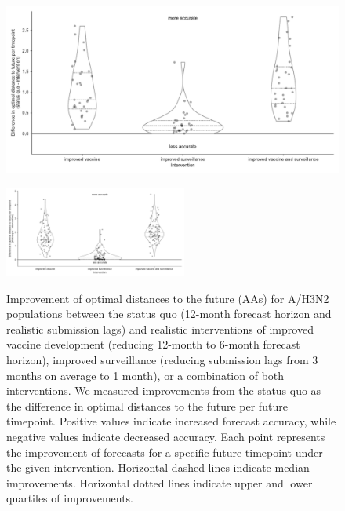 \documentclass[9pt,lineno]{elife}
\begin{document}
\begin{figure}[htb!]
\includegraphics[width=\linewidth]{figures/h3n2_optimal_effects_of_realistic_interventions_on_distances_to_the_future}
\caption{Improvement of optimal distances to the future (AAs) for A/H3N2 populations between the status quo (12-month forecast horizon and realistic submission lags) and realistic interventions of improved vaccine development (reducing 12-month to 6-month forecast horizon), improved surveillance (reducing submission lags from 3 months on average to 1 month), or a combination of both interventions.
  We measured improvements from the status quo as the difference in optimal distances to the future per future timepoint.
  Positive values indicate increased forecast accuracy, while negative values indicate decreased accuracy.
  Each point represents the improvement of forecasts for a specific future timepoint under the given intervention.
  Horizontal dashed lines indicate median improvements.
  Horizontal dotted lines indicate upper and lower quartiles of improvements.}
\label{fig:h3n2_optimal_effects_of_realistic_interventions}
%
{\includegraphics[width=6cm]{figures/simulated_optimal_effects_of_realistic_interventions_on_distances_to_the_future}}\label{figsupp:simulated_optimal_effects_of_realistic_interventions_on_distances_to_the_future}

\end{figure}
\end{document}
